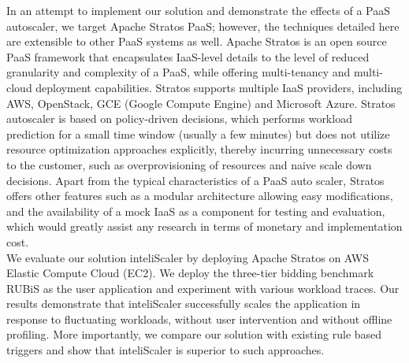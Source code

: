 In an attempt to implement our solution and demonstrate the effects of a PaaS autoscaler, we target Apache Stratos PaaS; however, the techniques detailed here are extensible to other PaaS systems as well. Apache Stratos is an open source PaaS framework that encapsulates IaaS-level details to the level of reduced granularity and complexity of a PaaS, while offering multi-tenancy and multi-cloud deployment capabilities. Stratos supports multiple IaaS providers, including AWS, OpenStack, GCE (Google Compute Engine) and Microsoft Azure\cite{website:stratos}. Stratos autoscaler is based on policy-driven decisions, which performs workload prediction for a small time window (usually a few minutes) but does not utilize resource optimization approaches explicitly, thereby incurring unnecessary costs to the customer, such as overprovisioning of resources and naive scale down decisions. Apart from the typical characteristics of a PaaS auto scaler, Stratos offers other features such as a modular architecture allowing easy modifications, and the availability of a mock IaaS as a component for testing and evaluation, which would greatly assist any research in terms of monetary and implementation cost.\\

We evaluate our solution inteliScaler by deploying Apache Stratos on AWS Elastic Compute Cloud (EC2). We deploy the three-tier bidding benchmark RUBiS as the user application and experiment with various workload traces. Our results demonstrate that inteliScaler successfully scales the application in response to fluctuating workloads, without user intervention and without offline profiling. More importantly, we compare our solution with existing rule based triggers and show that inteliScaler is superior to such approaches.\\
